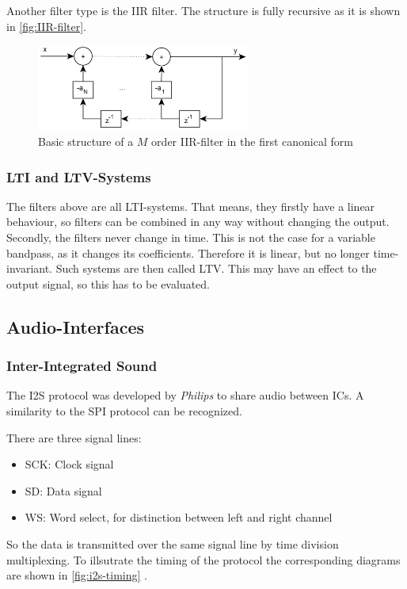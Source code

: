 Another filter type is the \ac{IIR} filter. The structure is fully recursive as it is shown in \autoref{fig:IIR-filter}.

\begin{figure}[!h]
    \centering
    \includegraphics[width=7cm]{img/iir.png}
    \caption{Basic structure of a $M$ order \ac{IIR}-filter in the first canonical form \cite{meyer_signalverarbeitung}}
    \label{fig:IIR-filter}
\end{figure}




\subsubsection{LTI and LTV-Systems}

The filters above are all \ac{LTI}-systems. That means, they firstly have a linear behaviour, so filters can be
combined in any way without changing the output. Secondly, the filters never change in time.
This is not the case for a variable bandpass, as it changes its coefficients. Therefore it is linear, but no
longer time-invariant. Such systems are then called \ac{LTV}.
This may have an effect to the output signal, so this has to be evaluated.

\subsection{Audio-Interfaces}

\subsubsection{Inter-Integrated Sound}

The \ac{I2S} protocol was developed by \textit{Philips} to share audio between \acp{IC}.
A similarity to the \ac{SPI} protocol can be recognized.

There are three signal lines:
\begin{itemize}
    \item SCK: Clock signal
    \item SD: Data signal
    \item WS: Word select, for distinction between left and right channel
\end{itemize}
So the data is transmitted over the same signal line by time division multiplexing. 
To illsutrate the timing of the protocol the corresponding diagrams are shown in \autoref{fig:i2s-timing} \cite{nxp_i2s}.

